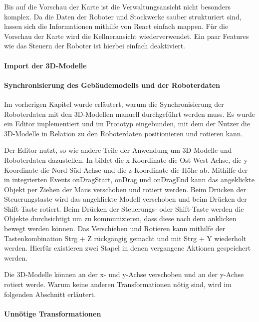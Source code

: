 Bis auf die Vorschau der Karte ist die Verwaltungsansicht nicht besonders komplex. Da die Daten der Roboter und Stockwerke sauber strukturiert sind, lassen sich die Informationen mithilfe von React einfach mappen. Für die Vorschau der Karte wird die Kellneransicht wiederverwendet. Ein paar Features wie das Steuern der Roboter ist hierbei einfach deaktiviert.

\paragraph{Import der 3D-Modelle}

\paragraph{Synchronisierung des Gebäudemodells und der Roboterdaten}
Im vorherigen Kapitel wurde erläutert, warum die Synchronisierung der Roboterdaten mit den 3D-Modellen manuell durchgeführt werden muss. Es wurde ein Editor implementiert und im Prototyp eingebunden, mit dem der Nutzer die 3D-Modelle in Relation zu den Roboterdaten positionieren und rotieren kann.

Der Editor nutzt, so wie andere Teile der Anwendung \deckgl{} um 3D-Modelle und Roboterdaten dazustellen. In \deckgl{} bildet die x-Koordinate die Ost-West-Achse, die y-Koordinate die Nord-Süd-Achse und die z-Koordinate die Höhe ab. Mithilfe der in \deckgl{} integrierten Events onDragStart, onDrag und onDragEnd kann das angeklickte Objekt per Ziehen der Maus verschoben und rotiert werden. Beim Drücken der Steuerungstaste wird das angeklickte Modell verschoben und beim Drücken der Shift-Taste rotiert. Beim Drücken der Steuerungs- oder Shift-Taste werden die Objekte durchsichtigt um zu kommunizieren, dass diese nach dem anklicken bewegt werden können. Das Verschieben und Rotieren kann mithilfe der Tastenkombination Strg + Z rückgängig gemacht und mit Strg + Y wiederholt werden. Hierfür existieren zwei Stapel in denen vergangene Aktionen gespeichert werden.

Die 3D-Modelle können an der x- und y-Achse verschoben und an der y-Achse rotiert werde. Warum keine anderen Transformationen nötig sind, wird im folgenden Abschnitt erläutert.

\paragraph{Unnötige Transformationen}

